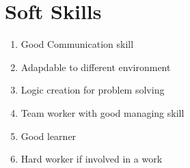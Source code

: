 \documentclass[a4paper,12pt,line]{article}
\begin{document}
	
	\section*{{\color{magenta}Soft Skills}}
	\begin{enumerate}
		\item Good Communication skill
		\item Adapdable to different environment
		\item Logic creation for problem solving
		\item Team worker with good managing skill
		\item Good learner
		\item Hard worker if involved in a work
	\end{enumerate}
	\vspace*{4.2cm}
	\newpage
	
	
\end{document}
